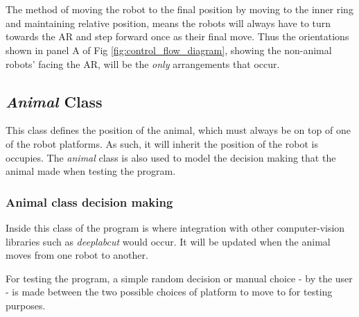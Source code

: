 
\\ \\ 

The method of moving the robot to the final position by moving to the inner ring and maintaining relative position, means the robots will always have to turn towards the AR and step forward once as their final move. Thus the orientations shown in panel A of Fig \ref{fig:control_flow_diagram}, showing the non-animal robots' facing the AR, will be the \textit{only} arrangements that occur.

\pagebreak
\subsection{\textit{Animal} Class}

This class defines the position of the animal, which must always be on top of one of the robot platforms. As such,    it will inherit the position of the robot is occupies. The \textit{animal} class is also used to model the decision making that the animal made when testing the program.


\subsubsection{Animal class decision making}

Inside this class of the program is where integration with other computer-vision libraries such as \textit{deeplabcut} \cite{dlc} would occur. It will be updated when the animal moves from one robot to another.

For testing the program, a simple random decision or manual choice - by the user - is made between the two possible choices of platform to move to for testing purposes.

